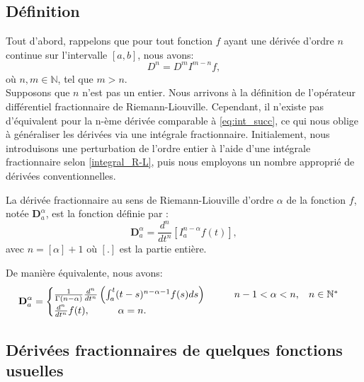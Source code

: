 \subsection{Définition}
Tout d'abord, rappelons que pour tout fonction $f$ ayant une dérivée d'ordre $n$ continue sur l'intervalle $[a,b]$, nous avons:
\begin{equation}\label{eq:def_R-L}
    D^n = D^m I^{m-n} f,
\end{equation}
où $n,m\in\mathbb{N}$, tel que $m>n$. \\
Supposons que $n$ n'est pas un entier. Nous arrivons à la définition de l'opérateur différentiel fractionnaire de Riemann-Liouville. Cependant, il n'existe pas d'équivalent pour la n-ème dérivée comparable à \ref{eq:int_succ}, ce qui nous oblige à généraliser les dérivées via une intégrale fractionnaire. Initialement, nous introduisons une perturbation de l'ordre entier à l'aide d'une intégrale fractionnaire selon \ref{integral_R-L}, puis nous employons un nombre approprié de dérivées conventionnelles. \cite{FDE&applications}
\begin{definition}
    La dérivée fractionnaire au sens de Riemann-Liouville d'ordre $\alpha$ de la fonction $f$, notée $ \textbf{D}_a^{\alpha}$, est la fonction définie par :\\
    \begin{equation} \label{eq:D_R-L}
        \textbf{D}_a^{\alpha} = \frac{d^n}{dt^n} \left[I_a^{n-\alpha} f(t) \right],
    \end{equation}
    avec $n =[\alpha] + 1$ où $[.]$ est la partie entière. 
\end{definition}
De manière équivalente, nous avons:
\begin{equation}
    \textbf{D}_a^{\alpha} =
    \begin{cases}
        \frac{1}{\Gamma(n-\alpha)} \frac{d^n}{dt^n}\left( \int_a^t(t-s)^{n-\alpha-1}f(s)ds\right) \hspace{1cm} n-1<\alpha<n, \hspace{0.3cm} n\in\mathbb{N^*}\\
        \frac{d^n}{dt^n} f(t), \hspace{1cm} \alpha =n.
    \end{cases}
\end{equation}
\subsection{Dérivées fractionnaires de quelques fonctions usuelles}
